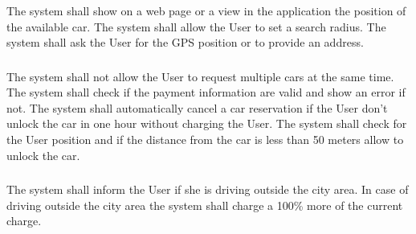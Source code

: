 \subsubsection{}
\begin{itemize}
	\reqcounter The system shall show on a web page or a view in the application the position of the available car.
	\reqcounter The system shall allow the User to set a search radius.
	\reqcounter The system shall ask the User for the GPS position or to provide an address.
\end{itemize}

\subsubsection{}

\subsubsection{}

\subsubsection{}
\begin{itemize}
	\reqcounter The system shall not allow the User to request multiple cars at the same time.
	\reqcounter The system shall check if the payment information are valid and show an error if not.
	\reqcounter The system shall automatically cancel a car reservation if the User don't unlock the car in one hour without charging the User.
	\reqcounter The system shall check for the User position and if the distance from the car is less than 50 meters
	allow to unlock the car.
\end{itemize}

\subsubsection{}
\begin{itemize}
	\reqcounter The system shall inform the User if she is driving outside the city area.
	\reqcounter In case of driving outside the city area the system shall charge a 100\%  more of the current charge.
\end{itemize}



\subsubsection{}

